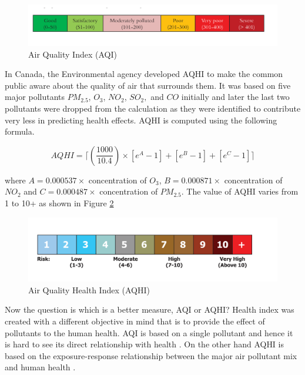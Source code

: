 \begin{figure}[h]
    \begin{center}
    \includegraphics[scale=0.58]{./images/figure13.png}
    \end{center}
   
    \caption{Air Quality Index (AQI) \cite{AirQualityIndex}}
    
    \label{aqi}
\end{figure}


In Canada, the Environmental agency developed AQHI to make the common public aware about the quality of air that surrounds them. It was based on five major pollutants $ PM_{2.5}$, $O_3$, $NO_2$, $SO_2,$ and $CO$ initially and later the last two pollutants were dropped from the calculation as they were identified to  contribute very less in predicting health effects. AQHI is computed using the following formula.


\begin{equation}
AQHI = \lceil (\frac{1000}{10.4}) \times [e^A-1]+[e^B-1]+[e^C-1] \rceil
\end{equation}

where $ A = 0.000537 \times$ concentration of  $O_3$, $B = 0.000871 \times$ concentration  of $NO_2$ and  $C = 0.000487 \times$ concentration of $PM_{2.5}$.
The value of AQHI varies from 1 to 10+ as shown in Figure \ref{aqhi}


\begin{figure}[h]
    \begin{center}
    \includegraphics[scale=0.58]{./images/figure12.png}
    \end{center}
   
    \caption{Air Quality Health Index (AQHI) \cite{healthcanada}}
    
    \label{aqhi}
\end{figure}

Now the question is which is a better measure, AQI or AQHI? Health index was created with a different objective in mind that is to provide the effect of pollutants to the human health. AQI is based on a single pollutant and hence it is hard to see its direct relationship with health \cite{Chen2013}. On the other hand AQHI is based on the exposure-response relationship between the major air pollutant mix and human health \cite{Chen2013}.%



